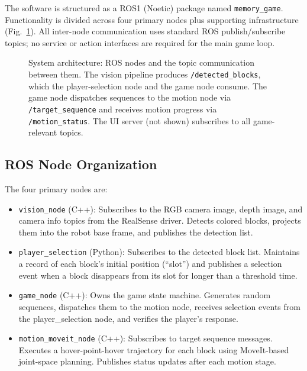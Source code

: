 \documentclass[conference]{IEEEtran}
\begin{document}
The software is structured as a ROS1 (Noetic) package named
\texttt{memory\_game}. Functionality is divided across four primary
nodes plus supporting infrastructure (Fig.~\ref{fig:arch}). All
inter-node communication uses standard ROS publish/subscribe topics;
no service or action interfaces are required for the main game loop.

\begin{figure}[t]
\centering
\fbox{\rule{0pt}{5.5cm}\rule{0.85\columnwidth}{0pt}}
\caption{System architecture: ROS nodes and the topic communication
between them. The vision pipeline produces \texttt{/detected\_blocks},
which the player-selection node and the game node consume. The game
node dispatches sequences to the motion node via
\texttt{/target\_sequence} and receives motion progress via
\texttt{/motion\_status}. The UI server (not shown) subscribes to all
game-relevant topics.}
\label{fig:arch}
\end{figure}

\subsection{ROS Node Organization}

The four primary nodes are:

\begin{itemize}
\item \texttt{vision\_node} (C++): Subscribes to the RGB camera image,
depth image, and camera info topics from the RealSense driver.
Detects colored blocks, projects them into the robot base frame, and
publishes the detection list.
\item \texttt{player\_selection} (Python): Subscribes to the detected
block list. Maintains a record of each block's initial position
(``slot'') and publishes a selection event when a block disappears
from its slot for longer than a threshold time.
\item \texttt{game\_node} (C++): Owns the game state machine. Generates
random sequences, dispatches them to the motion node, receives
selection events from the player\_selection node, and verifies the
player's response.
\item \texttt{motion\_moveit\_node} (C++): Subscribes to target sequence
messages. Executes a hover-point-hover trajectory for each block using
MoveIt-based joint-space planning. Publishes status updates after
each motion stage.
\end{itemize}
\end{document}
